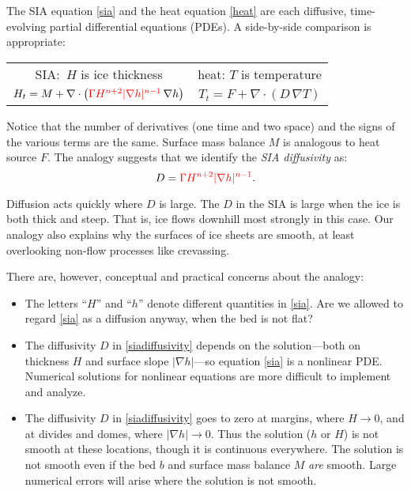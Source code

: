 \documentclass[letterpaper,final,12pt,reqno]{amsart}
\newcommand{\grad}{\nabla}
\newcommand{\Div}{\nabla\cdot}
\begin{document}
The SIA equation \eqref{sia} and the heat equation \eqref{heat} are each diffusive, time-evolving partial differential equations (PDEs).  A side-by-side comparison is appropriate:
\begin{center}
\begin{tabular}{cc}
\vspace{1mm}
SIA:\, $H$ is ice thickness & \phantom{foo bar} heat: $T$ is temperature\phantom{foo bar}  \\
\vspace{1mm}
	$H_t = M + \Div \left({\color{red}\Gamma H^{n+2} |\grad h|^{n-1}}\, \grad h \right)$  &  $T_t = F + \Div (D\, \grad T)$
\end{tabular}
\end{center}
\vspace{1mm}
Notice that the number of derivatives (one time and two space) and the signs of the various terms are the same.  Surface mass balance $M$ is analogous to heat source $F$.  The analogy suggests that we identify the \emph{SIA diffusivity} as:
\begin{equation}
	D = {\color{red}\Gamma H^{n+2} |\grad h|^{n-1}}.  \label{siadiffusivity}
\end{equation}

Diffusion acts quickly where $D$ is large.  The $D$ in the SIA is large when the ice is both thick and steep.  That is, ice flows downhill most strongly in this case.  Our analogy also explains why the surfaces of ice sheets are smooth, at least overlooking non-flow processes like crevassing.

There are, however, conceptual and practical concerns about the analogy:
\begin{itemize}
\item The letters ``$H$'' and ``$h$'' denote different quantities in \eqref{sia}.  Are we allowed to regard \eqref{sia} as a diffusion anyway, when the bed is not flat?
\item The diffusivity $D$ in \eqref{siadiffusivity} depends on the solution---both on thickness $H$ and surface slope $|\grad h|$---so equation \eqref{sia} is a nonlinear PDE.  Numerical solutions for nonlinear equations are more difficult to implement and analyze.
\item The diffusivity $D$ in \eqref{siadiffusivity} goes to zero at margins, where $H\to 0$, and at divides and domes, where $|\grad h|\to 0$.  Thus the solution ($h$ or $H$) is not smooth at these locations, though it is continuous everywhere.  The solution is not smooth even if the bed $b$ and surface mass balance $M$ \emph{are} smooth.  Large numerical errors will arise where the solution is not smooth.
\end{itemize}
\end{document}

